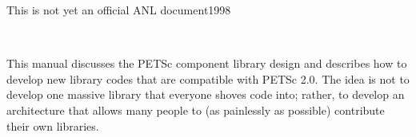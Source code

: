 %
%
%
\setlength{\textwidth}{6.5in}
\setlength{\oddsidemargin}{0.0in}
\setlength{\evensidemargin}{0.0in}
\setlength{\textheight}{9.2in}
\setlength{\topmargin}{-.8in}

\newcommand{\findex}[1]{\index{FUNCTION #1}}
\newcommand{\sindex}[1]{\index{#1}}
\newcommand{\F}{\mbox{\boldmath \(F\)}}
\newcommand{\x}{\mbox{\boldmath \(x\)}}
\newcommand{\rr}{\mbox{\boldmath \(r\)}}

\makeindex
 



{\Large This is not yet an official ANL document}{1998}

\newpage

\hbox{ }

\vspace{1in}
\date{\today}

\newpage


\medskip \medskip


%
%

\medskip \medskip
This manual discusses the PETSc component library design and describes
how to develop new library codes that are compatible with PETSc 2.0.
The idea is not to develop one massive library that everyone shoves code 
into; rather, to develop an architecture that allows many people
to (as painlessly as possible) contribute their own libraries.


